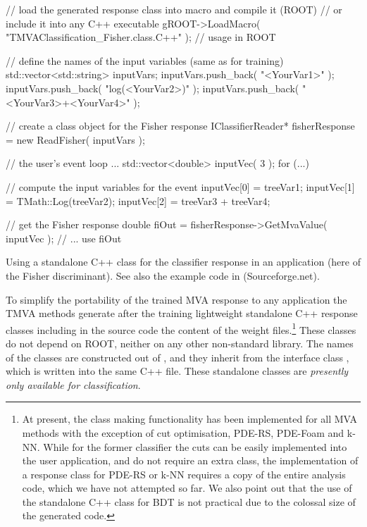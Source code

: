\begin{codeexample}[tb]
\begin{tmvacode}
// load the generated response class into macro and compile it (ROOT)
// or include it into any C++ executable
gROOT->LoadMacro( "TMVAClassification_Fisher.class.C++" ); // usage in ROOT 

// define the names of the input variables (same as for training)
std::vector<std::string> inputVars;
inputVars.push_back( "<YourVar1>" );
inputVars.push_back( "log(<YourVar2>)" );
inputVars.push_back( "<YourVar3>+<YourVar4>" );

// create a class object for the Fisher response
IClassifierReader* fisherResponse = new ReadFisher( inputVars );

// the user's event loop ...
std::vector<double> inputVec( 3 );
for (...) {
   // compute the input variables for the event
   inputVec[0] = treeVar1;
   inputVec[1] = TMath::Log(treeVar2);
   inputVec[2] = treeVar3 + treeVar4;

   // get the Fisher response
   double fiOut = fisherResponse->GetMvaValue( inputVec );
   // ... use fiOut
}
\end{tmvacode}
\caption[.]{\codeexampleCaptionSize
            Using a standalone C++ class for the classifier
            response in an application (here of the Fisher discriminant). See also the 
            example code in  (Sourceforge.net).}
\label{ce:standaloneClasses}
\end{codeexample}
To simplify the portability of the trained MVA response to any application the TMVA 
methods generate after the training lightweight standalone C++ response classes 
including in the source code the content of the weight files.\footnote
{
   At present, the class making functionality has been implemented for 
   all MVA methods with the exception of cut optimisation, PDE-RS, PDE-Foam and k-NN. While 
   for the former classifier the cuts can be easily implemented into the user application, 
   and do not require an extra class, the implementation of a response class for
   PDE-RS or k-NN requires a copy of the entire analysis code, which we have not 
   attempted so far. We also point out that the use of the standalone C++ class
   for BDT is not practical due to the colossal size of the generated code. 
} 
These classes do not depend on ROOT, neither on any other non-standard library.
The names of the classes are constructed out of , and
they inherit from the interface class , which is written 
into the same C++ file. These standalone classes are {\em presently only available 
for classification}.

